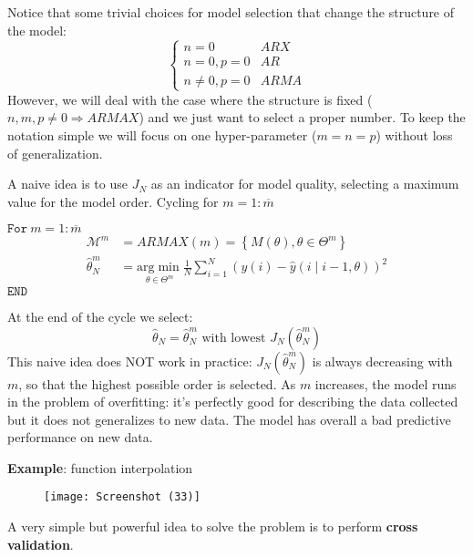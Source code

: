 Notice that some trivial choices for model selection that change the structure of the model:
\begin{equation*}
\begin{cases}
n=0 & ARX\\
n=0,p=0 & AR\\
n\neq 0,p=0 & ARMA
\end{cases}
\end{equation*}
However, we will deal with the case where the structure is fixed ($ n,m,p\neq 0\Longrightarrow ARMAX$) and we just want to select a proper number. To keep the notation simple we will focus on one hyper-parameter ($ m=n=p$) without loss of generalization.



A naive idea is to use $ J_{N}$ as an indicator for model quality, selecting a maximum value for the model order. Cycling for $ m=1:\overline{m}$

$ \mathtt{For }\ m=1:\overline{m}$
\begin{equation*}
\begin{aligned}
\mathcal{M}^{m} & =ARMAX(m) =\left\{M(\theta) ,\theta \in \Theta ^{m}\right\}\\
\hat{\theta }_{N}^{m} & =\underset{\theta \in \Theta ^{m}}{\mathrm{arg}\min}\frac{1}{N}\sum _{i=1}^{N}(y(i) -\hat{y}(i\mid i-1,\theta))^{2}
\end{aligned}
\end{equation*}
$ \mathtt{END}$

At the end of the cycle we select:
\begin{equation*}
\hat{\theta }_{N} =\hat{\theta }_{N}^{m} \text{ with lowest } J_{N}\left(\hat{\theta }_{N}^{m}\right)
\end{equation*}
This naive idea does NOT work in practice: $ J_{N}\left(\hat{\theta }_{N}^{m}\right)$ is always decreasing with $ m$, so that the highest possible order is selected. As $ m$ increases, the model runs in the problem of overfitting: it's perfectly good for describing the data collected but it does not generalizes to new data. The model has overall a bad predictive performance on new data.



\textbf{Example}: function interpolation
\begin{figure}[htpb]
    \centering
    \texttt{[image: Screenshot (33)]}
\end{figure}
\FloatBarrier

A very simple but powerful idea to solve the problem is to perform \textbf{cross validation}.

